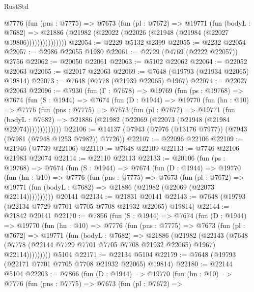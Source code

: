 \begin{lexlean}{RustStd}
\begin{coremodule}
{\begin{coremodule}
{{{{{{{{{{{{{{{{{{{{{{{{{{{{{{{{{{{{{{{{{{{{{{{{{{{{{              @7776
                (fun (pns : @7775) =>
                @7673
                  (fun (pl : @7672) =>
                  @19771
                    (fun (bodyL : @7682) =>
                    @21886 (@21982 (@22022 (@22026 (@21948 (@21984 (@22027 @19806)))))))))))))))
@22054 := @2229 @5132 @2399
@22055 := @2232 @22054
@22057 := @2986 @22055 @1980
@22061 := @2729 (@4769 (@2222 @22057)) @2756
@22062 := @20050 @22061
@22063 := @5102 @22062
@22064 := @22052 @22063
@22065 := @22017 @22063
@22069 := @7648 (@19793 (@21934 @22065) @19814)
@22073 := @7648 (@7778 (@21939 @22065) @1967)
@22074 := @22027 @22063
@22096 := @7930
    (fun (Γ : @7678) =>
    @19769
      (fun (ps : @19768) =>
      @7674
        (fun (S : @1944) =>
        @7674
          (fun (D : @1944) =>
          @19770
            (fun (hn : @10) =>
            @7776
              (fun (pns : @7775) =>
              @7673
                (fun (pl : @7672) =>
                @19771
                  (fun (bodyL : @7682) =>
                  @21886 (@21982 (@22069 (@22073 (@21948 (@21984 @22074)))))))))))))
@22106 := @14137 (@7943 (@7976 (@13176 @7977)) (@7943 (@7981 (@7948 @1253 @7982)) @7726))
@22107 := @22096 @22106
@22109 := @21946 (@7739 @22106)
@22110 := @7648 @22109
@22113 := @7746 @22106 @21983 @22074
@22114 := @22110 @22113
@22133 := @20106
    (fun (ps : @19768) =>
    @7674
      (fun (S : @1944) =>
      @7674
        (fun (D : @1944) =>
        @19770
          (fun (hn : @10) =>
          @7776
            (fun (pns : @7775) =>
            @7673
              (fun (pl : @7672) =>
              @19771 (fun (bodyL : @7682) => @21886 (@21982 (@22069 (@22073 @22114))))))))))
    @20141
@22134 := @21831 @20141
@22143 := @7648 (@19793 (@22134 @7729 @7701 @7705 @7708 @21932 @22065) @19814)
@22144 := @21842 @20141
@22170 := @7866
    (fun (S : @1944) =>
    @7674
      (fun (D : @1944) =>
      @19770
        (fun (hn : @10) =>
        @7776
          (fun (pns : @7775) =>
          @7673
            (fun (pl : @7672) =>
            @19771
              (fun (bodyL : @7682) =>
              @21886
                (@21982
                  (@22143
                    (@7648
                      (@7778 (@22144 @7729 @7701 @7705 @7708 @21932 @22065) @1967)
                      @22114)))))))))
    @5104
@22171 := @22134 @5104
@22179 := @7648 (@19793 (@22171 @7701 @7705 @7708 @21932 @22065) @19814)
@22180 := @22144 @5104
@22203 := @7866
    (fun (D : @1944) =>
    @19770
      (fun (hn : @10) =>
      @7776
        (fun (pns : @7775) =>
        @7673
          (fun (pl : @7672) =>
}}}}}}}}}}}}}}}}}}}}}}}}}}}}}}}}}}}}}}}}}}}}}}}}}}}}}
\end{coremodule}}
\end{coremodule}
\end{lexlean}
